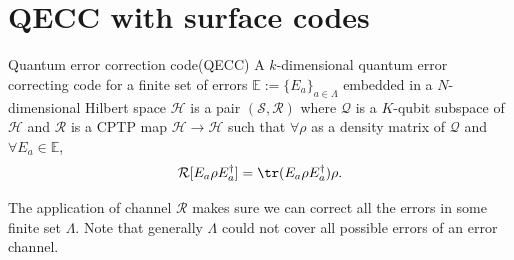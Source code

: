 \documentclass[11pt]{article}
\begin{document}

\section{QECC with surface codes}
\begin{definition}{Quantum error correction code(QECC)}
    A $k$-dimensional quantum error correcting code for a finite set of errors $ \mathbb{E} := \{ E_a \}_{a \in \Lambda}$ embedded in a $N$-dimensional Hilbert space $\mathcal{H}$ is a pair $(\mathcal{S}, \mathcal{R})$ where $\mathcal{Q}$ is a $K$-qubit subspace of $\mathcal{H}$ and $\mathcal{R}$ is a CPTP map $\mathcal{H} \to  \mathcal{H} $ such that $\forall \rho$ as a density matrix of $\mathcal{Q}$ and $\forall E_a \in \mathbb{E}$,  
    \begin{align}
        \mathcal{R}[E_a \rho E_a^\dagger]= \tr(E_a \rho E_a^\dagger)\rho.
    \end{align}
\end{definition}

The application of channel $\mathcal{R}$ makes sure we can correct all the errors in some finite set $\Lambda$.  Note that generally $\Lambda$ could not cover all possible errors of an error channel. 
\end{document}

